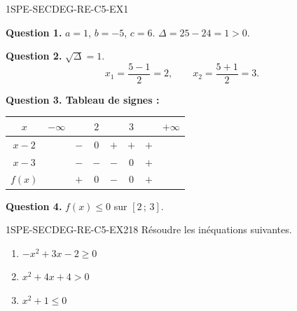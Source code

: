 \begin{corrige}{1SPE-SECDEG-RE-C5-EX1}


\textbf{Question 1.} $a = 1$, $b = -5$, $c = 6$. $\Delta = 25 - 24 = 1 > 0$.

\textbf{Question 2.} $\sqrt{\Delta} = 1$.
\[
x_1 = \frac{5 - 1}{2} = 2, \qquad x_2 = \frac{5 + 1}{2} = 3.
\]

\textbf{Question 3. Tableau de signes :}

\begin{center}
\begin{tabular}{|c|ccccccc|}
\hline
$x$ & $-\infty$ & & $2$ & & $3$ & & $+\infty$ \\
\hline
$x-2$ & & $-$ & $0$ & $+$ & $+$ & $+$ & \\
$x-3$ & & $-$ & $-$ & $-$ & $0$ & $+$ & \\
\hline
$f(x)$ & & $+$ & $0$ & $-$ & $0$ & $+$ & \\
\hline
\end{tabular}
\end{center}


\textbf{Question 4.} $f(x) \leq 0$ sur $[2\,;\,3]$.

\end{corrige}


\begin{exercice}{1SPE-SECDEG-RE-C5-EX2}{1}{8}
Résoudre les inéquations suivantes.
\begin{enumerate}
  \item $-x^2 + 3x - 2 \geq 0$
  \item $x^2 + 4x + 4 > 0$
  \item $x^2 + 1 \leq 0$
\end{enumerate}
\end{exercice}



